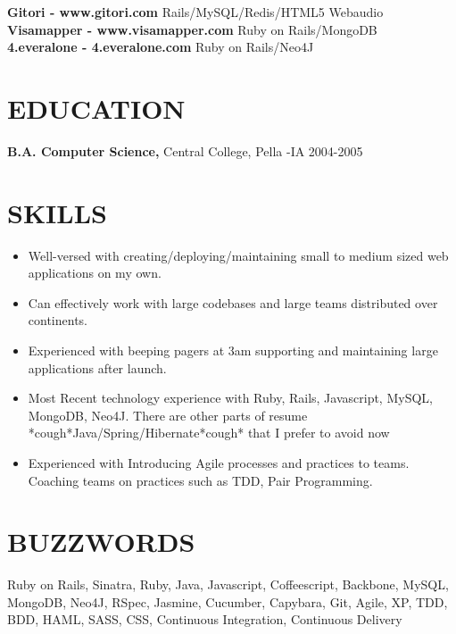 \documentclass{res}
\begin{document}
\begin{resume}
\begin{tabbing}
    {\bf Gitori - www.gitori.com}   \>Rails/MySQL/Redis/HTML5 Webaudio \\

    {\bf Visamapper - www.visamapper.com  } \>Ruby on Rails/MongoDB \\
 
    {\bf 4.everalone - 4.everalone.com} \>Ruby on Rails/Neo4J \\
\end{tabbing}

\section{EDUCATION}
    {\bf B.A. Computer Science,} Central College, Pella -IA
    2004-2005


\section{SKILLS}          
 \begin{itemize} \itemsep -2pt  %
\item Well-versed with creating/deploying/maintaining small to medium sized web applications on my own.
\item Can effectively work with large codebases and large teams distributed over continents.
\item Experienced with beeping pagers at 3am supporting and maintaining large applications after launch.
\item Most Recent technology experience with Ruby, Rails, Javascript, MySQL, MongoDB, Neo4J. There are other parts of resume *cough*Java/Spring/Hibernate*cough* that I prefer to avoid now
\item Experienced with Introducing Agile processes and practices to teams. Coaching teams on practices such as TDD, Pair Programming.

 \end{itemize}


\section{BUZZWORDS}          
Ruby on Rails, Sinatra, Ruby, Java, Javascript, Coffeescript, Backbone, MySQL, MongoDB, Neo4J, RSpec, Jasmine, Cucumber, Capybara, Git, Agile, XP, TDD, BDD, HAML, SASS, CSS, Continuous Integration, Continuous Delivery 
 
\end{resume}
\end{document}
